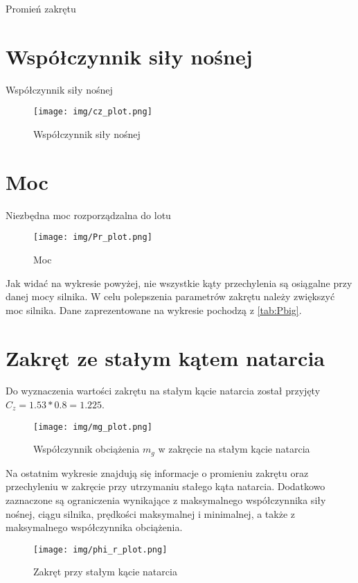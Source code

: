 \documentclass{sprawozdanie}
\begin{document}
\begin{table}[H]
    \centering
    \resizebox{0.9\width}{!}{}
    \caption{Promień zakrętu}
    \label{tab:Rbig}
\end{table}




\section{Współczynnik siły nośnej }

\begin{table}[H]
    \centering
    
    \caption{Współczynnik siły nośnej}
    \label{tab:c_z}
\end{table}

\begin{figure}[H]
    \centering
    \texttt{[image: img/cz\_plot.png]}
    \caption{Współczynnik siły nośnej}
    \label{fig:c_z}
\end{figure}


\section{Moc}

\begin{sidewaystable}
    \centering
    
    \caption{Niezbędna moc rozporządzalna do lotu}
    \label{tab:Pbig}
\end{sidewaystable}

\begin{figure}[H]
    \centering
    \texttt{[image: img/Pr\_plot.png]}
    \caption{Moc}
    \label{fig:P}
\end{figure}

Jak widać na wykresie powyżej, nie wszystkie kąty przechylenia są osiągalne przy danej mocy silnika. W celu polepszenia parametrów zakrętu należy zwiększyć moc silnika. Dane zaprezentowane na wykresie pochodzą z \ref{tab:Pbig}.

\newpage
\section{Zakręt ze stałym kątem natarcia}
Do wyznaczenia wartości zakrętu na stałym kącie natarcia został przyjęty  $C_z = 1.53*0.8 = 1.225$.
\begin{figure}[H]
    \centering
    \texttt{[image: img/mg\_plot.png]}
    \caption{Współczynnik obciążenia $m_g$ w zakręcie na stałym kącie natarcia}
    \label{fig:mg}
\end{figure}
Na ostatnim wykresie znajdują się informacje o promieniu zakrętu oraz przechyleniu w zakręcie przy utrzymaniu stałego kąta natarcia. Dodatkowo zaznaczone są ograniczenia wynikające z maksymalnego współczynnika siły nośnej, ciągu silnika, prędkości maksymalnej i minimalnej, a także z maksymalnego współczynnika obciążenia.

\begin{figure}[H]
    \centering
    \texttt{[image: img/phi\_r\_plot.png]}
    \caption{Zakręt przy stałym kącie natarcia}
    \label{fig:N}
\end{figure}
\end{document}
